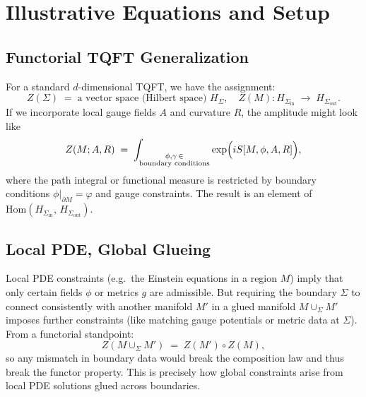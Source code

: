\documentclass[12pt]{article}
\begin{document}
\section{Illustrative Equations and Setup}
\label{sec:IllustrativeMath}

\subsection{Functorial TQFT Generalization}
For a standard $d$-dimensional TQFT, we have the assignment:
\[
Z(\Sigma) \;=\; \text{a vector space (Hilbert space) $H_{\Sigma}$},
\quad
Z(M): H_{\Sigma_{\mathrm{in}}} \;\to\; H_{\Sigma_{\mathrm{out}}}.
\]
If we incorporate local gauge fields $A$ and curvature $R$, the amplitude might look like
\begin{equation}\label{eq:ZAmplitude}
Z(M; A, R) \;=\; \int_{\substack{\phi,\gamma \,\in \\ \text{boundary conditions}}}
\exp\Bigl( i S[M,\phi,A,R]\Bigr),
\end{equation}
where the path integral or functional measure is restricted by boundary conditions $\phi \big|_{\partial M} = \varphi$
and gauge constraints. The result is an element of $\mathrm{Hom}(H_{\Sigma_{\mathrm{in}}},\, H_{\Sigma_{\mathrm{out}}})$.

\subsection{Local PDE, Global Glueing}
Local PDE constraints (e.g.\ the Einstein equations in a region $M$) imply that only certain fields $\phi$ or metrics $g$
are admissible. But requiring the boundary $\Sigma$ to connect consistently with another manifold $M'$ in a glued manifold $M \cup_\Sigma M'$
imposes further constraints (like matching gauge potentials or metric data at $\Sigma$). From a functorial standpoint:
\[
Z(M \cup_\Sigma M') \;=\; Z(M') \circ Z(M),
\]
so any mismatch in boundary data would break the composition law and thus break the functor property. This is precisely how
global constraints arise from local PDE solutions glued across boundaries.
\end{document}
